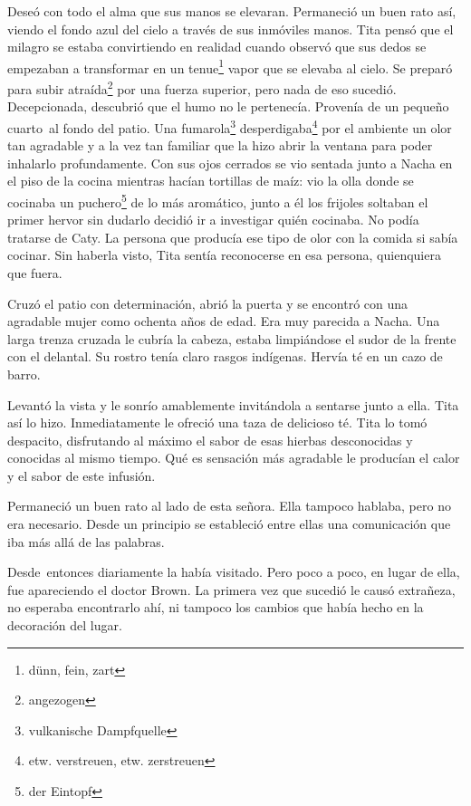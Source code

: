 Deseó con todo el alma que sus manos se elevaran. Permaneció un buen
rato así, viendo el fondo azul del cielo a través de sus inmóviles
manos. Tita pensó que el milagro se estaba convirtiendo en realidad
cuando observó que sus dedos se empezaban a transformar en un tenue\footnote{dünn, fein, zart}
vapor que se elevaba al cielo. Se preparó para subir atraída\footnote{angezogen} por una
fuerza superior, pero nada de eso sucedió. Decepcionada, descubrió que
el humo no le pertenecía.
Provenía de un pequeño cuarto~al fondo del patio. Una fumarola\footnote{vulkanische Dampfquelle} desperdigaba\footnote{etw. verstreuen, etw. zerstreuen}
por el ambiente un olor tan agradable y a la vez tan
familiar que la hizo abrir la ventana para poder inhalarlo
profundamente. Con sus ojos cerrados se vio sentada junto a Nacha en el
piso de la cocina mientras hacían tortillas de maíz: vio la olla donde
se cocinaba un puchero\footnote{der Eintopf} de lo más aromático,
junto a él los frijoles soltaban el primer hervor \ndots sin dudarlo
decidió ir a investigar quién cocinaba. No podía tratarse de Caty. La
persona que producía ese tipo de olor con la comida si sabía cocinar.
Sin haberla visto, Tita sentía reconocerse en esa persona, quienquiera
que fuera.

Cruzó el patio con determinación, abrió la puerta y se encontró con una
agradable mujer como ochenta años de edad. Era muy parecida a Nacha. Una
larga trenza cruzada le cubría la cabeza, estaba limpiándose el sudor de
la frente con el delantal. Su rostro tenía claro rasgos indígenas.
Hervía té en un cazo de barro.

Levantó la vista y le sonrío amablemente invitándola a sentarse junto a
ella. Tita así lo hizo. Inmediatamente le ofreció una taza de
delicioso té.
Tita lo tomó despacito, disfrutando al máximo el sabor de esas hierbas
desconocidas y conocidas al mismo tiempo. Qué es sensación más agradable
le producían el calor y el sabor de este infusión.

Permaneció un buen rato al lado de esta señora. Ella tampoco hablaba,
pero no era necesario. Desde un principio se estableció entre ellas una
comunicación que iba más allá de las palabras.

Desde~entonces diariamente la había visitado. Pero poco a poco, en
lugar de ella, fue apareciendo el doctor Brown. La primera vez que
sucedió le causó extrañeza, no esperaba encontrarlo ahí, ni tampoco los
cambios que había hecho en la decoración del lugar.

